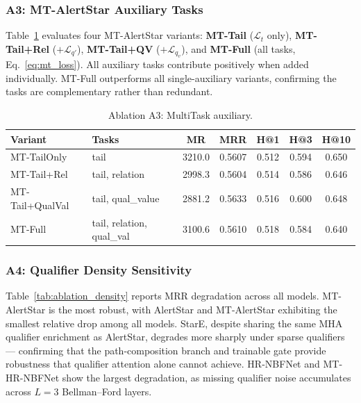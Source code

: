 \documentclass[10pt,journal,compsoc]{IEEEtran}
\begin{document}
\subsubsection{A3: MT-AlertStar Auxiliary Tasks}
\label{sssec:a3}
Table~\ref{tab:ablation_multitask} evaluates four
MT-AlertStar variants: \textbf{MT-Tail} ($\mathcal{L}_t$
only), \textbf{MT-Tail+Rel} ($+\mathcal{L}_{q'}$),
\textbf{MT-Tail+QV} ($+\mathcal{L}_{q_v}$), and
\textbf{MT-Full} (all tasks, Eq.~\ref{eq:mt_loss}).
All auxiliary tasks contribute positively when added
individually. MT-Full outperforms all single-auxiliary
variants, confirming the tasks are complementary
rather than redundant.
\begin{table}[H]
\tiny
\centering
\caption{Ablation A3: MultiTask auxiliary.}
\label{tab:ablation_multitask}
\begin{tabular}{l|l|ccccc}
\toprule
\textbf{Variant} & \textbf{Tasks} 
  & \textbf{MR} & \textbf{MRR} & \textbf{H@1} & \textbf{H@3} & \textbf{H@10} \\
\midrule
MT-TailOnly     & tail                              & 3210.0 & 0.5607 & 0.512 & 0.594 & 0.650 \\
MT-Tail+Rel     & tail, relation                    & 2998.3 & 0.5604 & 0.514 & 0.586 & 0.646 \\
MT-Tail+QualVal & tail, qual\_value                 & 2881.2 & 0.5633 & 0.516 & 0.600 & 0.648 \\
\rowcolor{gray!15}
MT-Full         & tail, relation, qual\_val    & 3100.6 & 0.5610 & 0.518 & 0.584 & 0.640 \\
\bottomrule
\end{tabular}
\end{table}

\subsubsection{A4: Qualifier Density Sensitivity}
\label{sssec:a4}
Table~\ref{tab:ablation_density} reports MRR
degradation across all models.
MT-AlertStar is the most robust, with AlertStar and
MT-AlertStar exhibiting the smallest relative drop
among all models. StarE, despite sharing the same
MHA qualifier enrichment as AlertStar, degrades more
sharply under sparse qualifiers --- confirming that
the path-composition branch and trainable gate
provide robustness that qualifier attention alone
cannot achieve. HR-NBFNet and MT-HR-NBFNet show the
largest degradation, as missing qualifier noise
accumulates across $L{=}3$ Bellman--Ford layers.
\end{document}
